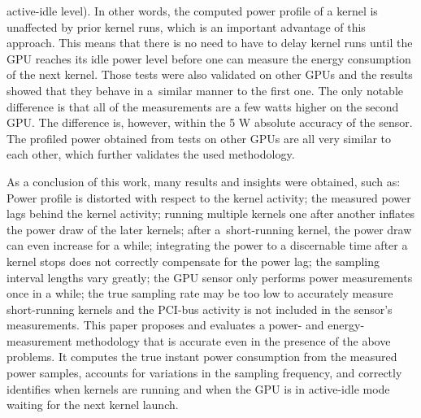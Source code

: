 active-idle level). In other words, the computed power profile of
a kernel is unaffected by prior kernel runs, which is an important
advantage of this approach. This means that there is no need to
have to delay kernel runs until the GPU reaches its idle power
level before one can measure the energy consumption of the next
kernel. Those tests were also validated on other GPUs and the
results showed that they behave in a~similar manner to the first
one. The only notable difference is that all of the measurements
are a few watts higher on the second GPU\@. The difference is,
however, within the 5 W absolute accuracy of the sensor. The
profiled power obtained from tests on other GPUs are all very
similar to each other, which further validates the used methodology.

As a conclusion of this work, many results and insights were
obtained, such as: Power profile is distorted with respect to the
kernel activity; the measured power lags behind the kernel
activity; running multiple kernels one after another inflates the
power draw of the later kernels; after a~short-running kernel, the
power draw can even increase for a while; integrating the power to
a discernable time after a kernel stops does not correctly
compensate for the power lag; the sampling interval lengths vary
greatly; the GPU sensor only performs power measurements once in
a while; the true sampling rate may be too low to accurately
measure short-running kernels and the PCI-bus activity is not
included in the sensor's measurements. This paper proposes and
evaluates a power- and energy-measurement methodology that is
accurate even in the presence of the above problems. It computes
the true instant power consumption from the measured power samples,
accounts for variations in the sampling frequency, and correctly
identifies when kernels are running and when the GPU is in
active-idle mode waiting for the next kernel launch.

